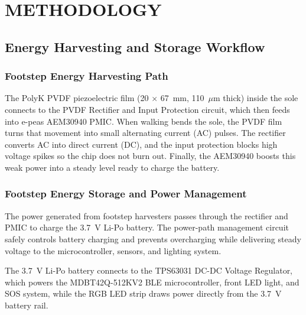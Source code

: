 \chapter{METHODOLOGY}
\section{Energy Harvesting and Storage Workflow} %
\subsection{Footstep Energy Harvesting Path} %
The PolyK PVDF piezoelectric film (20 $\times$ 67~mm, 110~$\mu$m thick) inside the sole connects to the PVDF Rectifier and Input Protection circuit, which then feeds into e-peas AEM30940 PMIC\@. When walking bends the sole, the PVDF film turns that movement into small alternating current (AC) pulses. The rectifier converts AC into direct current (DC), and the input protection blocks high voltage spikes so the chip does not burn out. Finally, the AEM30940 boosts this weak power into a steady level ready to charge the battery.

\subsection{Footstep Energy Storage and Power Management} %
The power generated from footstep harvesters passes through the rectifier and PMIC to charge the 3.7~V Li-Po battery. The power-path management circuit safely controls battery charging and prevents overcharging while delivering steady voltage to the microcontroller, sensors, and lighting system.

The 3.7~V Li-Po battery connects to the TPS63031 DC-DC Voltage Regulator, which powers the MDBT42Q-512KV2 BLE microcontroller, front LED light, and SOS system, while the RGB LED strip draws power directly from the 3.7~V battery rail.

